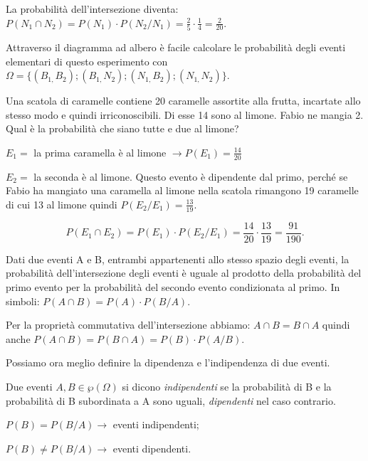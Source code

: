 \begin{esempio}
\begin{center}
\begin{tikzpicture}[x=10mm,y=10mm,font=\small]
\end{tikzpicture}

\end{center}

La probabilità dell'intersezione diventa: \(P(N_1\cap N_2)=P(N_1)\cdot 
P(N_2/N_1)=\frac 2 5\cdot \frac 1 4=\frac 2{20}\).

Attraverso il diagramma ad albero è facile calcolare le probabilità degli 
eventi 
elementari di questo esperimento con \(\Omega 
=\{(B_{1,}B_2);(B_{1,}N_2);(N_{1,}B_2);(N_{1,}N_2)\}\).
\end{esempio}

\begin{esempio}
Una scatola di caramelle contiene 20 caramelle assortite alla frutta, 
incartate allo stesso modo e quindi irriconoscibili. Di esse 14 sono al 
limone. Fabio ne mangia 2. Qual è la probabilità che siano tutte e due al 
limone?
\begin{itemize*}
\item \(E_1=\) la prima caramella è al limone \(\to P(E_1)=\frac{14}{20}\)
\item \(E_2=\) la seconda è al limone. Questo evento è dipendente dal primo, 
perché se Fabio ha mangiato una caramella al limone nella scatola rimangono 
19 caramelle di cui 13 al limone quindi \(P(E_2/E_1)=\frac{13}{19}\).
\end{itemize*}
\[P(E_1\cap E_2)=P(E_1)\cdot P(E_2/E_1)=\frac{14}{20}\cdot 
\frac{13}{19}=\frac{91}{190}.\]
\end{esempio}

\begin{teorema}
Dati due eventi A e B, entrambi appartenenti allo stesso spazio degli eventi, 
la 
probabilità dell'intersezione degli eventi è uguale al prodotto della 
probabilità del primo evento per la probabilità del secondo evento 
condizionata al primo. In simboli: \(P(A\cap B)=P(A)\cdot P(B/A)\).
\end{teorema}

Per la proprietà commutativa dell'intersezione abbiamo: \(A\cap B=B\cap A\) 
quindi 
anche \(P(A\cap B)=P(B\cap A)=P(B)\cdot P(A/B)\).

Possiamo ora meglio definire la dipendenza e l'indipendenza di due eventi.

\begin{definizione}
Due eventi \(A,B\in \wp (\Omega )\) si dicono \emph{indipendenti} se la 
probabilità di B e la probabilità di B subordinata a A sono uguali, 
\emph{dipendenti} nel caso contrario.

\(P(B)=P(B/A)\to\) eventi indipendenti;

 \({P}(B)\neq P(B/A)\to\) eventi dipendenti.
\end{definizione}

